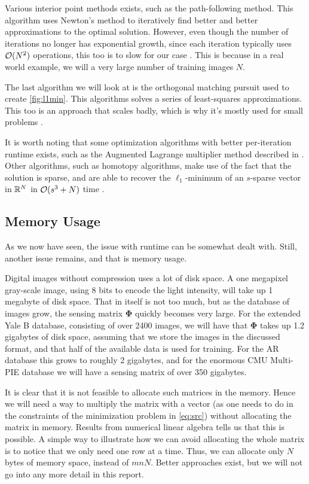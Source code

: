 Various interior point methods exists, such as the path-following method. This algorithm uses Newton's method to iteratively find better and better approximations to the optimal solution. However, even though the number of iterations no longer has exponential growth, since each iteration typically uses $ \mathcal{O}(N^{2}) $ operations, this too is to slow for our case \cite[Section~12.6]{eldar12theoryapplic}. This is because in a real world example, we will a very large number of training images $ N $.

The last algorithm we will look at is the orthogonal matching pursuit used to create \cref{fig:l1min}. This algorithms solves a series of least-squares approximations. This too is an approach that scales badly, which is why it's mostly used for small problems \cite[Secion~3.2]{foucart13intro}.

It is worth noting that some optimization algorithms with better per-iteration runtime exists, such as the Augmented Lagrange multiplier method described in \cite[Alg.~12.2]{foucart13intro}. Other algorithms, such as homotopy algorithms, make use of the fact that the solution is sparse, and are able to recover the $ \ell_{1} $-minimum of an $ s $-sparse vector in $ \mathbb{R}^{N} $ in $ \mathcal{O}(s^{3} + N) $ time \cite{wright09facerecog}.



\subsection{Memory Usage}
As we now have seen, the issue with runtime can be somewhat dealt with. Still, another issue remains, and that is memory usage. 

Digital images without compression uses a lot of disk space. A one megapixel gray-scale image, using 8 bits to encode the light intensity, will take up 1 megabyte of disk space. That in itself is not too much, but as the database of images grow, the sensing matrix $ \mathbf{\Phi} $ quickly becomes very large. For the extended Yale B database, consisting of over 2400 images, we will have that $ \mathbf{\Phi} $ takes up 1.2 gigabytes of disk space, assuming that we store the images in the discussed format, and that half of the available data is used for training. For the AR database this grows to roughly 2 gigabytes, and for the enormous CMU Multi-PIE database we will have a sensing matrix of over 350 gigabytes. 

It is clear that it is not feasible to allocate such matrices in the memory. Hence we will need a way to multiply the matrix with a vector (as one needs to do in the constraints of the minimization problem in \eqref{eq:src}) without allocating the matrix in memory. Results from numerical linear algebra tells us that this is possible. A simple way to illustrate how we can avoid allocating the whole matrix is to notice that we only need one row at a time. Thus, we can allocate only $ N $ bytes of memory space, instead of $ mnN $. Better approaches exist, but we will not go into any more detail in this report. 

